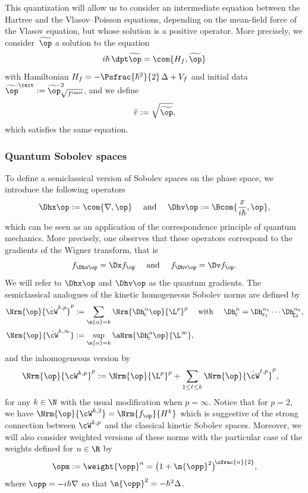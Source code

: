 This quantization will allow us to consider an intermediate equation between the Hartree and the Vlasov--Poisson equations, depending on the mean-field force of the Vlasov equation, but whose solution is a positive operator. More precisely, we consider~$\widetilde{\op}$ a solution to the equation
\begin{equation*}
i\hbar\,\dpt\widetilde{\op} = \com{H_f,\widetilde{\op}}
\end{equation*}
with Hamiltonian $H_f=-\Psfrac{\hbar^2}{2}\,\Delta+V_{f}$ and initial data $\widetilde{\op}^\init := \widetilde{\op}_{\sqrt{f^\init}}^2$, and we define
\begin{equation*}
\tilde v := \sqrt{\widetilde{\op}},
\end{equation*}
which satisfies the same equation.

\subsubsection{Quantum Sobolev spaces} To define a semiclassical version of Sobolev spaces on the phase space, we introduce the following operators
\begin{equation*}
\Dhx \op := \com{\nabla,\op} \quad \text{ and } \quad
\Dhv \op := \Bcom{\frac{x}{i\hbar},\op},
\end{equation*}
which can be seen as an application of the correspondence principle of quantum mechanics. More precisely, one observes that these operators correspond to the gradients of the Wigner transform, that is
\begin{equation*}
f_{\Dhx \op} = \Dx f_{\op}\quad \text{ and } \quad f_{\Dhv \op} = \Dv f_{\op}.
\end{equation*}
We will refer to $\Dhx\op$ and $\Dhv\op$ as the quantum gradients. The semiclassical analogues of the kinetic homogeneous Sobolev norms are defined by
\begin{subequations}
\begin{align*}
\Nrm{\op}{\dot{\cW}^{k,p}}^p &:= \sum_{\n{\alpha}=k} \Nrm{\Dh_{\!z}^\alpha\op}{\L^p}^p\quad \text{ with } \quad \Dh_{\!z}^\alpha = \Dh_{\!x_1}^{\alpha_1}\cdots\Dh_{\!\xi_3}^{\alpha_6},
\\
\Nrm{\op}{\dot{\cW}^{k,\infty}} &:= \sup_{\n{\alpha}= k} \aNrm{\Dh_{\!z}^\alpha\op}{\L^\infty},
\end{align*}
\end{subequations}
and the inhomogeneous version by
\begin{align*}
\Nrm{\op}{\cW^{k,p}}^p &:= \Nrm{\op}{\L^p}^p + \sum_{1\le \ell \le k}{\Nrm{\op}{\dot{\cW}^{\ell,p}}^p},
\end{align*}
for any $k\in\N$ with the usual modification when $p=\infty$. Notice that for $p=2$, we have $\Nrm{\op}{\cW^{k,2}} = \Nrm{f_{\op}}{H^k}$ which is suggestive of the strong connection between $\cW^{k, p}$ and the classical kinetic Sobolev spaces. Moreover, we will also consider weighted versions of these norms with the particular case of the weights defined for $n\in \R$ by
\begin{equation}\label{eq:weight}
\opm := \weight{\opp}^n = \big(1 + \n{\opp}^2\big)^{\!\sfrac{n}{2}},
\end{equation}
where $\opp = -i\hbar\nabla$ so that $\n{\opp}^2 = -\hbar^2\Delta$.

